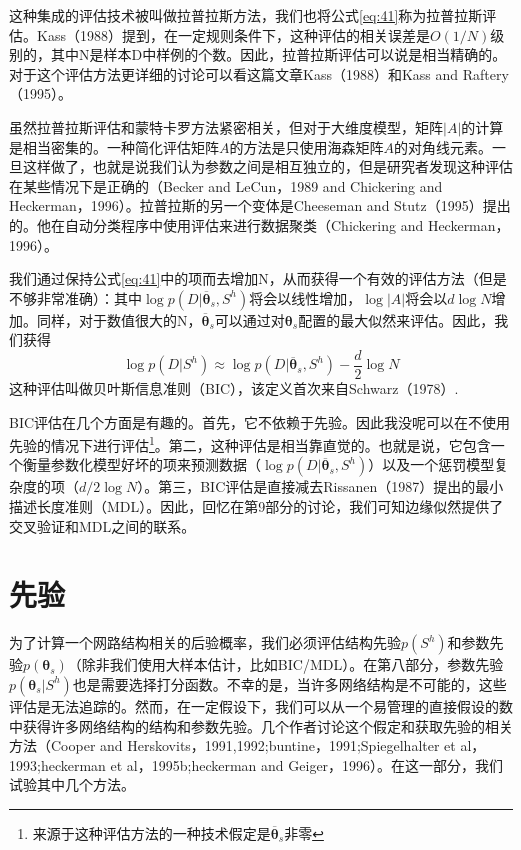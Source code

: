 \documentclass[10pt,a4paper]{article}
\begin{document}
\begin{CJK*}{UTF8}{gkai}
这种集成的评估技术被叫做拉普拉斯方法，我们也将公式\ref{eq:41}称为拉普拉斯评估。Kass（1988）提到，在一定规则条件下，这种评估的相关误差是$O(1/N)$级别的，其中N是样本D中样例的个数。因此，拉普拉斯评估可以说是相当精确的。对于这个评估方法更详细的讨论可以看这篇文章Kass（1988）和Kass and Raftery（1995）。



虽然拉普拉斯评估和蒙特卡罗方法紧密相关，但对于大维度模型，矩阵$|A|$的计算是相当密集的。一种简化评估矩阵$A$的方法是只使用海森矩阵$A$的对角线元素。一旦这样做了，也就是说我们认为参数之间是相互独立的，但是研究者发现这种评估在某些情况下是正确的（Becker and LeCun，1989 and Chickering and Heckerman，1996）。拉普拉斯的另一个变体是Cheeseman and Stutz（1995）提出的。他在自动分类程序中使用评估来进行数据聚类（Chickering and Heckerman，1996）。


我们通过保持公式\ref{eq:41}中的项而去增加N，从而获得一个有效的评估方法（但是不够非常准确）：其中$\log p(D|\overline{\boldsymbol{\theta}}_s,S^h)$将会以线性增加，$\log |A|$将会以$d\log N$增加。同样，对于数值很大的N，$\overline{\boldsymbol{\theta}}_s$可以通过对$\boldsymbol{\theta}_s$配置的最大似然来评估。因此，我们获得
\begin{equation}
\label{eq:42}
\log p(D|S^h) \approx \log p(D|\overline{\boldsymbol{\theta}}_s,S^h)-\frac{d}{2}\log N
\end{equation}
这种评估叫做贝叶斯信息准则（BIC），该定义首次来自Schwarz（1978）.



BIC评估在几个方面是有趣的。首先，它不依赖于先验。因此我没呢可以在不使用先验的情况下进行评估\footnote{来源于这种评估方法的一种技术假定是$\overline{\boldsymbol{\theta}}_s$非零}。第二，这种评估是相当靠直觉的。也就是说，它包含一个衡量参数化模型好坏的项来预测数据（$\log p(D|\overline{\boldsymbol{\theta}}_s,S^h)$）以及一个惩罚模型复杂度的项（$d/2\log N$）。第三，BIC评估是直接减去Rissanen（1987）提出的最小描述长度准则（MDL）。因此，回忆在第9部分的讨论，我们可知边缘似然提供了交叉验证和MDL之间的联系。


\section{先验}
为了计算一个网路结构相关的后验概率，我们必须评估结构先验$p(S^h)$和参数先验$p(\boldsymbol{\theta}_s)$（除非我们使用大样本估计，比如BIC/MDL）。在第八部分，参数先验$p(\boldsymbol{\theta}_s|S^h)$也是需要选择打分函数。不幸的是，当许多网络结构是不可能的，这些评估是无法追踪的。然而，在一定假设下，我们可以从一个易管理的直接假设的数中获得许多网络结构的结构和参数先验。几个作者讨论这个假定和获取先验的相关方法（Cooper and Herskovits，1991,1992;buntine，1991;Spiegelhalter et al，1993;heckerman et al，1995b;heckerman and Geiger，1996）。在这一部分，我们试验其中几个方法。



\end{CJK*}
\end{document}
